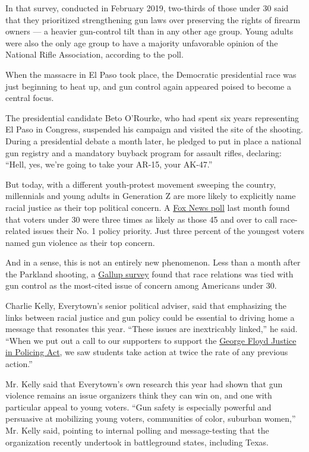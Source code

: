 In that survey, conducted in February 2019, two-thirds of those under 30
said that they prioritized strengthening gun laws over preserving the
rights of firearm owners --- a heavier gun-control tilt than in any
other age group. Young adults were also the only age group to have a
majority unfavorable opinion of the National Rifle Association,
according to the poll.

When the massacre in El Paso took place, the Democratic presidential
race was just beginning to heat up, and gun control again appeared
poised to become a central focus.

The presidential candidate Beto O'Rourke, who had spent six years
representing El Paso in Congress, suspended his campaign and visited the
site of the shooting. During a presidential debate a month later, he
pledged to put in place a national gun registry and a mandatory buyback
program for assault rifles, declaring: ``Hell, yes, we're going to take
your AR-15, your AK-47.''

But today, with a different youth-protest movement sweeping the country,
millennials and young adults in Generation Z are more likely to
explicitly name racial justice as their top political concern. A
\href{https://static.foxnews.com/foxnews.com/content/uploads/2020/07/Fox_July-12-15-2020_Complete_National_Topline_July-19-Release.pdf}{Fox
News poll} last month found that voters under 30 were three times as
likely as those 45 and over to call race-related issues their No. 1
policy priority. Just three percent of the youngest voters named gun
violence as their top concern.

And in a sense, this is not an entirely new phenomenon. Less than a
month after the Parkland shooting, a
\href{https://news.gallup.com/poll/229562/preference-stricter-gun-laws-highest-1993.aspx}{Gallup
survey} found that race relations was tied with gun control as the
most-cited issue of concern among Americans under 30.

Charlie Kelly, Everytown's senior political adviser, said that
emphasizing the links between racial justice and gun policy could be
essential to driving home a message that resonates this year. ``These
issues are inextricably linked,'' he said. ``When we put out a call to
our supporters to support the
\href{https://www.nytimes.com/2020/06/25/us/politics/house-police-overhaul-bill.html}{George
Floyd Justice in Policing Act}, we saw students take action at twice the
rate of any previous action.''

Mr. Kelly said that Everytown's own research this year had shown that
gun violence remains an issue organizers think they can win on, and one
with particular appeal to young voters. ``Gun safety is especially
powerful and persuasive at mobilizing young voters, communities of
color, suburban women,'' Mr. Kelly said, pointing to internal polling
and message-testing that the organization recently undertook in
battleground states, including Texas.

